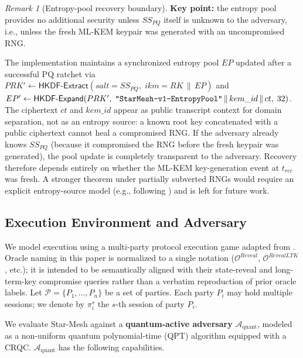 \documentclass[11pt,a4paper]{article}
\theoremstyle{remark}
\newtheorem{remark}[theorem]{Remark}
\theoremstyle{plain}
\newcommand{\calA}{\mathcal{A}}
\newcommand{\calO}{\mathcal{O}}
\newcommand{\HKDFExtract}{\mathsf{HKDF\text{-}Extract}}
\newcommand{\HKDFExpand}{\mathsf{HKDF\text{-}Expand}}
\newcommand{\strlit}[1]{\text{\upshape\texttt{"#1"}}}
\begin{document}
\begin{remark}[Entropy-pool recovery boundary]
\label{rem:entropy-pool}
\textbf{Key point:} the entropy pool provides no additional security unless $SS_{PQ}$ itself is
unknown to the adversary, i.e., unless the fresh ML-KEM keypair was generated with an
uncompromised RNG.

The implementation maintains a synchronized entropy pool $EP$ updated after a successful PQ
ratchet via $PRK' \gets \HKDFExtract(salt = SS_{PQ},\; ikm = RK \,\|\, EP)$ and
$EP' \gets \HKDFExpand(PRK',\; \strlit{StarMesh-v1-EntropyPool} \,\|\, kem\_id \,\|\, ct,\; 32)$.  The ciphertext $ct$ and $kem\_id$ appear as public transcript
context for domain separation, not as an entropy source: a known root key concatenated with a
public ciphertext cannot heal a compromised RNG.  If the adversary already knows $SS_{PQ}$
(because it compromised the RNG before the fresh keypair was generated), the pool update is
completely transparent to the adversary.  Recovery therefore depends entirely on whether the
ML-KEM key-generation event at $t_{rec}$ was fresh.  A stronger theorem under partially
subverted RNGs would require an explicit entropy-source model (e.g., following
\cite{dodis2013entropic}) and is left for future work.
\end{remark}

\subsection{Execution Environment and Adversary}

We model execution using a multi-party protocol execution game adapted from
\cite{cohngordon2016,cremers2024ratchet}.  Oracle naming in this paper is normalized to a
single notation ($\calO^{Reveal}$, $\calO^{RevealLTK}$, etc.); it is intended to be
semantically aligned with their state-reveal and long-term-key compromise queries rather than a
verbatim reproduction of prior oracle labels.  Let $\mathcal{P} = \{P_1, \ldots, P_n\}$ be a set
of parties.  Each party $P_i$ may hold multiple sessions; we denote by $\pi^s_i$ the $s$-th
session of party $P_i$.

We evaluate Star-Mesh against a \textbf{quantum-active adversary} $\calA_{\mathrm{quant}}$,
modeled as a non-uniform quantum polynomial-time (QPT) algorithm equipped with a CRQC.
$\calA_{\mathrm{quant}}$ has the following capabilities.
\end{document}

